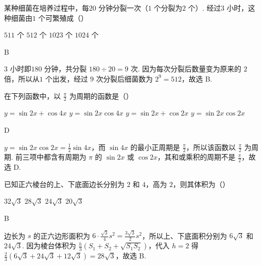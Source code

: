 \documentclass[UTF8,a4paper,oneside,11pt]{ctexbook}
\begin{document}
\begin{problem}
某种细菌在培养过程中，每\(20\text{ 分钟}\)分裂一次（\(1\text{ 个}\)分裂为\(2\text{ 个}\)）. 经过\(3\text{ 小时}\)，这种细菌由\(1\text{ 个}\)可繁殖成（\quad）

\choices
    {\(511\text{ 个}\)}
    {\(512\text{ 个}\)}
    {\(1023\text{ 个}\)}
    {\(1024\text{ 个}\)}
\end{problem}

\begin{answer}
B
\end{answer}

\begin{solution}
\(3\text{ 小时}\)即\(180\text{ 分钟}\)，共分裂 \(180\div 20=9\) 次. 因为每次分裂后数量变为原来的 \(2\) 倍，所以从\(1\text{ 个}\)出发，经过 \(9\) 次分裂后细菌数为 \(2^{9}=512\)，故选 B.
\end{solution}

\begin{problem}
在下列函数中，以 \(\frac{\pi}{2}\) 为周期的函数是（\quad）

\choices
    {\(y=\sin 2x+\cos 4x\)}
    {\(y=\sin 2x\cos 4x\)}
    {\(y=\sin 2x+\cos 2x\)}
    {\(y=\sin 2x\cos 2x\)}
\end{problem}

\begin{answer}
D
\end{answer}

\begin{solution}
\(y=\sin 2x\cos 2x=\frac{1}{2}\sin 4x\)，而 \(\sin 4x\) 的最小正周期是 \(\frac{\pi}{2}\)，所以该函数以 \(\frac{\pi}{2}\) 为周期. 前三项中都含有周期为 \(\pi\) 的 \(\sin 2x\) 或 \(\cos 2x\)，其和或乘积的周期不是 \(\frac{\pi}{2}\)，故选 D.
\end{solution}

\begin{problem}
已知正六棱台的上、下底面边长分别为 \(2\) 和 \(4\)，高为 \(2\)，则其体积为（\quad）

\choices
    {\(32\sqrt{3}\)}
    {\(28\sqrt{3}\)}
    {\(24\sqrt{3}\)}
    {\(20\sqrt{3}\)}
\end{problem}

\begin{answer}
B
\end{answer}

\begin{solution}
边长为 \(s\) 的正六边形面积为 \(6\cdot\frac{\sqrt{3}}{4}s^{2}=\frac{3\sqrt{3}}{2}s^{2}\)，所以上、下底面积分别为 \(6\sqrt{3}\) 和 \(24\sqrt{3}\). 因为棱台体积为 \(\frac{h}{3}\left( S_{1}+S_{2}+\sqrt{S_{1}S_{2}} \right)\)，代入 \(h=2\) 得 \(\frac{2}{3}\left( 6\sqrt{3}+24\sqrt{3}+12\sqrt{3} \right)=28\sqrt{3}\)，故选 B.
\end{solution}
\end{document}
